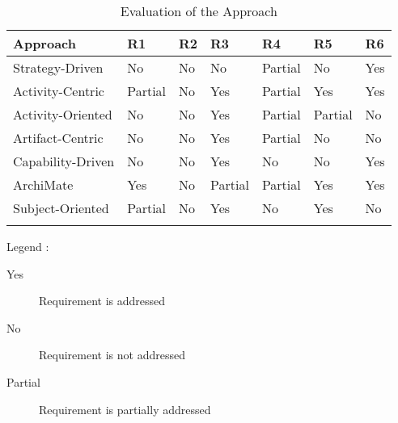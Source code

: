 \begin{center}
	\begin{longtable}{p{6cm}p{1.5cm}p{1.5cm}p{1.5cm}p{1.5cm}p{1.5cm}p{1.5cm}} 
		\toprule 
		\textbf{Approach} & \textbf{R1}  & \textbf{R2}  & \textbf{R3}  & \textbf{R4}  & \textbf{R5} & \textbf{R6} \\
		\midrule
		\endfirsthead
		
		Strategy-Driven & No  & No  & No  & Partial  & No  & Yes\\
		Activity-Centric   & Partial   & No  & Yes  & Partial  & Yes  & Yes \\
		Activity-Oriented    & No  & No  & Yes  & Partial   & Partial  & No \\
		Artifact-Centric    & No  & No  & Yes  & Partial & No  & No \\ %
		Capability-Driven   & No  & No  & Yes  & No  & No  & Yes\\
		ArchiMate  & Yes  & No  & Partial  & Partial  & Yes  & Yes \\
		Subject-Oriented   &Partial  & No  & Yes  & No   & Yes   & No\\
		
		\bottomrule
		\caption{Evaluation of the Approach}
		\label{tab:evaluationoftheapproach}
	\end{longtable}	
\end{center}
Legend :
\begin{description}
	\item[Yes]      Requirement is addressed
	\item[No]       Requirement is not addressed
	\item[Partial]  Requirement is partially addressed
\end{description}



 


